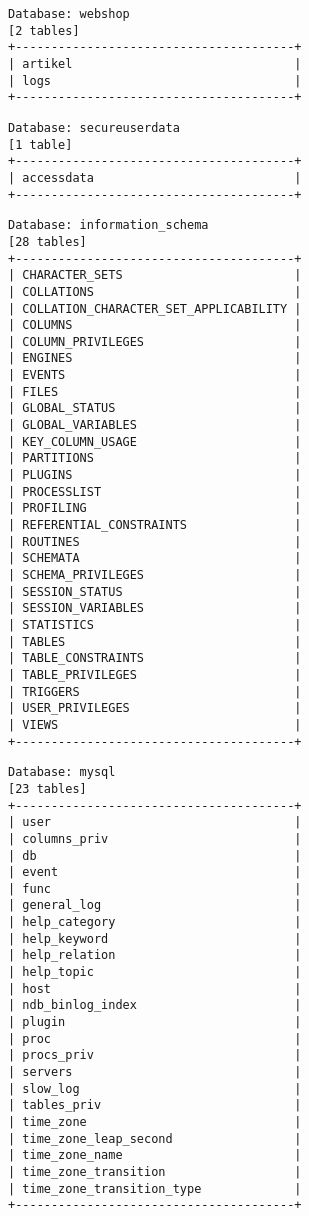 \documentclass[10pt,a4paper]{article}
\begin{document}
\begin{verbatim}
Database: webshop
[2 tables]
+---------------------------------------+
| artikel                               |
| logs                                  |
+---------------------------------------+
\end{verbatim}

\begin{verbatim}
Database: secureuserdata
[1 table]
+---------------------------------------+
| accessdata                            |
+---------------------------------------+
\end{verbatim}

\begin{verbatim}
Database: information_schema
[28 tables]
+---------------------------------------+
| CHARACTER_SETS                        |
| COLLATIONS                            |
| COLLATION_CHARACTER_SET_APPLICABILITY |
| COLUMNS                               |
| COLUMN_PRIVILEGES                     |
| ENGINES                               |
| EVENTS                                |
| FILES                                 |
| GLOBAL_STATUS                         |
| GLOBAL_VARIABLES                      |
| KEY_COLUMN_USAGE                      |
| PARTITIONS                            |
| PLUGINS                               |
| PROCESSLIST                           |
| PROFILING                             |
| REFERENTIAL_CONSTRAINTS               |
| ROUTINES                              |
| SCHEMATA                              |
| SCHEMA_PRIVILEGES                     |
| SESSION_STATUS                        |
| SESSION_VARIABLES                     |
| STATISTICS                            |
| TABLES                                |
| TABLE_CONSTRAINTS                     |
| TABLE_PRIVILEGES                      |
| TRIGGERS                              |
| USER_PRIVILEGES                       |
| VIEWS                                 |
+---------------------------------------+
\end{verbatim}

\begin{verbatim}
Database: mysql
[23 tables]
+---------------------------------------+
| user                                  |
| columns_priv                          |
| db                                    |
| event                                 |
| func                                  |
| general_log                           |
| help_category                         |
| help_keyword                          |
| help_relation                         |
| help_topic                            |
| host                                  |
| ndb_binlog_index                      |
| plugin                                |
| proc                                  |
| procs_priv                            |
| servers                               |
| slow_log                              |
| tables_priv                           |
| time_zone                             |
| time_zone_leap_second                 |
| time_zone_name                        |
| time_zone_transition                  |
| time_zone_transition_type             |
+---------------------------------------+
\end{verbatim}
\end{document}
